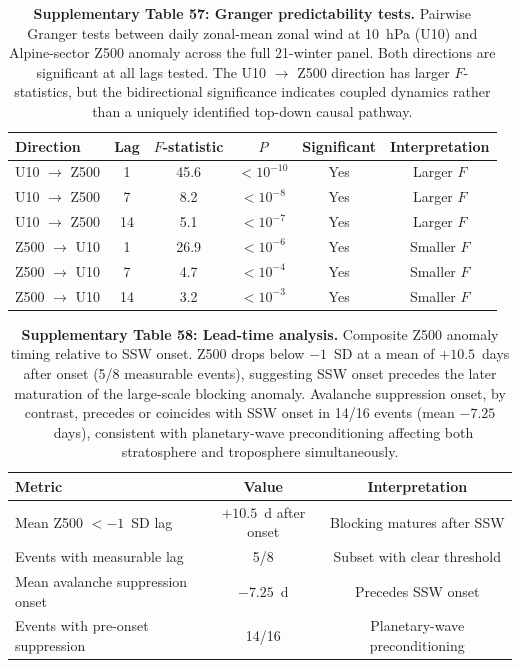 \documentclass[11pt,letterpaper]{article}
\begin{document}
\begin{table}[!ht]
\centering
\caption{\textbf{Supplementary Table 57: Granger predictability tests.}
Pairwise Granger tests between daily zonal-mean zonal wind at 10~hPa (U10) and Alpine-sector Z500 anomaly across the full 21-winter panel. Both directions are significant at all lags tested. The U10 $\to$ Z500 direction has larger $F$-statistics, but the bidirectional significance indicates coupled dynamics rather than a uniquely identified top-down causal pathway.}
\label{tab:granger}
\small
\begin{tabular}{lccccc}
\toprule
Direction & Lag & $F$-statistic & $P$ & Significant & Interpretation \\
\midrule
U10 $\to$ Z500 & 1 & 45.6 & $< 10^{-10}$ & Yes & Larger $F$ \\
U10 $\to$ Z500 & 7 & 8.2 & $< 10^{-8}$ & Yes & Larger $F$ \\
U10 $\to$ Z500 & 14 & 5.1 & $< 10^{-7}$ & Yes & Larger $F$ \\
\midrule
Z500 $\to$ U10 & 1 & 26.9 & $< 10^{-6}$ & Yes & Smaller $F$ \\
Z500 $\to$ U10 & 7 & 4.7 & $< 10^{-4}$ & Yes & Smaller $F$ \\
Z500 $\to$ U10 & 14 & 3.2 & $< 10^{-3}$ & Yes & Smaller $F$ \\
\bottomrule
\end{tabular}
\end{table}

\begin{table}[!ht]
\centering
\caption{\textbf{Supplementary Table 58: Lead-time analysis.}
Composite Z500 anomaly timing relative to SSW onset. Z500 drops below $-1$~SD at a mean of $+10.5$~days after onset (5/8 measurable events), suggesting SSW onset precedes the later maturation of the large-scale blocking anomaly. Avalanche suppression onset, by contrast, precedes or coincides with SSW onset in 14/16 events (mean $-7.25$~days), consistent with planetary-wave preconditioning affecting both stratosphere and troposphere simultaneously.}
\label{tab:lead_time}
\small
\begin{tabular}{lcc}
\toprule
Metric & Value & Interpretation \\
\midrule
Mean Z500 $< -1$~SD lag & $+10.5$~d after onset & Blocking matures after SSW \\
Events with measurable lag & 5/8 & Subset with clear threshold \\
Mean avalanche suppression onset & $-7.25$~d & Precedes SSW onset \\
Events with pre-onset suppression & 14/16 & Planetary-wave preconditioning \\
\bottomrule
\end{tabular}
\end{table}
\end{document}
